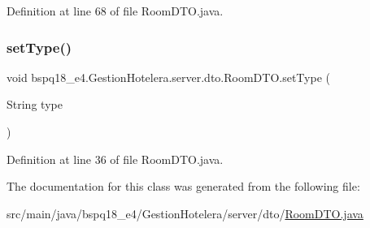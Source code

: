 Definition at line 68 of file Room\+D\+T\+O.\+java.

\mbox{\label{classbspq18__e4_1_1_gestion_hotelera_1_1server_1_1dto_1_1_room_d_t_o_a6c43ea6bd66434f07cde0f940e65f9f8}} 
\subsubsection{\texorpdfstring{set\+Type()}{setType()}}
{\footnotesize\ttfamily void bspq18\+\_\+e4.\+Gestion\+Hotelera.\+server.\+dto.\+Room\+D\+T\+O.\+set\+Type (\begin{DoxyParamCaption}\item[{String}]{type }\end{DoxyParamCaption})}



Definition at line 36 of file Room\+D\+T\+O.\+java.



The documentation for this class was generated from the following file\+:\begin{DoxyCompactItemize}
\item 
src/main/java/bspq18\+\_\+e4/\+Gestion\+Hotelera/server/dto/\mbox{\hyperlink{_room_d_t_o_8java}{Room\+D\+T\+O.\+java}}\end{DoxyCompactItemize}

